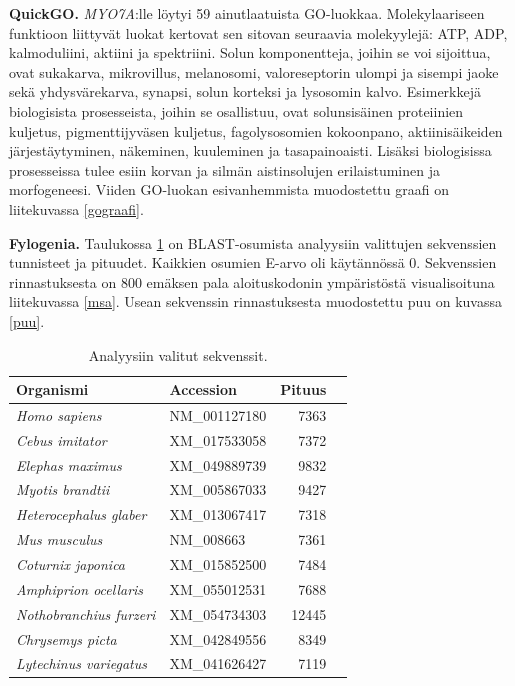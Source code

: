 \documentclass[a4paper,11pt,notitlepage]{article}
\begin{document}
\textbf{QuickGO.} \textit{MYO7A}:lle löytyi 59 ainutlaatuista GO-luokkaa. Molekylaariseen funktioon liittyvät luokat kertovat sen sitovan seuraavia molekyylejä: ATP, ADP, kalmoduliini, aktiini ja spektriini. Solun komponentteja, joihin se voi sijoittua, ovat sukakarva, mikrovillus, melanosomi, valoreseptorin ulompi ja sisempi jaoke sekä yhdysvärekarva, synapsi, solun korteksi ja lysosomin kalvo. Esimerkkejä biologisista prosesseista, joihin se osallistuu, ovat solunsisäinen proteiinien kuljetus, pigmenttijyväsen kuljetus, fagolysosomien kokoonpano, aktiinisäikeiden järjestäytyminen, näkeminen, kuuleminen ja tasapainoaisti. Lisäksi biologisissa prosesseissa tulee esiin korvan ja silmän aistinsolujen erilaistuminen ja morfogeneesi. Viiden GO-luokan esivanhemmista muodostettu graafi on liitekuvassa \ref{gograafi}.

\textbf{Fylogenia.} Taulukossa \ref{blast} on BLAST-osumista analyysiin valittujen sekvenssien tunnisteet ja pituudet. Kaikkien osumien E-arvo oli käytännössä 0. Sekvenssien rinnastuksesta on 800 emäksen pala aloituskodonin ympäristöstä visualisoituna liitekuvassa \ref{msa}. Usean sekvenssin rinnastuksesta muodostettu puu on kuvassa \ref{puu}.

\begin{table}[!h]
	\centering
	\caption{Analyysiin valitut sekvenssit.} \label{blast}
	\begin{tabular}{llrc}
	\toprule
	\textbf{Organismi} & \textbf{Accession} & \textbf{Pituus} \\
	\midrule
	\textit{Homo sapiens} & NM\_001127180 & 7363 \\
	\textit{Cebus imitator} & XM\_017533058 & 7372 \\
	\textit{Elephas maximus} & XM\_049889739 & 9832 \\
	\textit{Myotis brandtii} & XM\_005867033 & 9427 \\
	\textit{Heterocephalus glaber} & XM\_013067417 & 7318 \\
	\textit{Mus musculus} & NM\_008663 & 7361 \\
	\textit{Coturnix japonica} & XM\_015852500 & 7484 \\
	\textit{Amphiprion ocellaris} & XM\_055012531 & 7688 \\
	\textit{Nothobranchius furzeri} & XM\_054734303 & 12445 \\
	\textit{Chrysemys picta} & XM\_042849556 & 8349 \\
	\textit{Lytechinus variegatus} & XM\_041626427 & 7119 \\
	\bottomrule
	\end{tabular}
\end{table}
\end{document}
